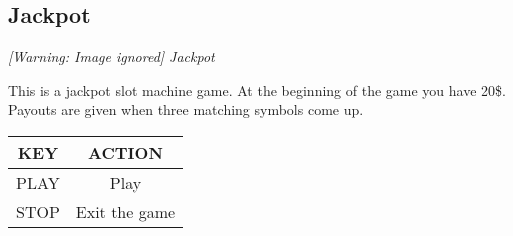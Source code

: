 \subsection{Jackpot}
{\centering\itshape
  [Warning: Image ignored] %
 \newline
Jackpot
\par}

This is a jackpot slot machine game. At the beginning of the game you
have 20\$.  Payouts are given when three matching symbols come up.

\begin{table}[h!]
\begin{tabular}{|c|c|}
\hline
KEY & ACTION \\\hline
PLAY & Play \\\hline
STOP & Exit the game \\\hline
\end{tabular}
\end{table}


